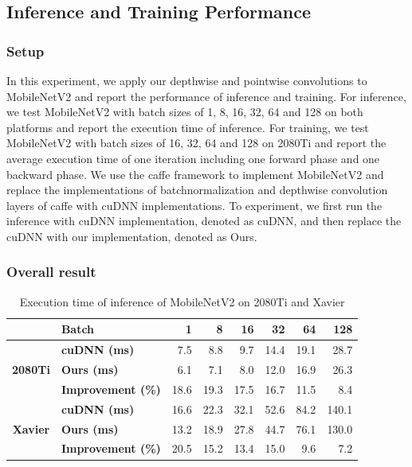\subsection{Inference and Training Performance}
\label{sec:inferexp}
\subsubsection{Setup} 
In this experiment, we apply our depthwise and pointwise convolutions to MobileNetV2 and report the performance of inference and training. 
For inference, we test MobileNetV2 with batch sizes of 1, 8, 16, 32, 64 and 128 on both platforms and report the execution time of inference. 
For training, we test MobileNetV2 with batch sizes of 16, 32, 64 and 128 on 2080Ti and report the average execution time of one iteration including one forward phase and one backward phase.
We use the caffe framework to implement MobileNetV2 and replace the implementations of batchnormalization and depthwise convolution layers of caffe with cuDNN implementations. 
To experiment, we first run the inference with cuDNN implementation, denoted as cuDNN, and then replace the cuDNN with our implementation, denoted as Ours.

\subsubsection{Overall result}
\begin{table}[]
\setlength{\tabcolsep}{4.6pt}
    \caption{Execution time of inference of MobileNetV2 on 2080Ti and Xavier}
    \label{tab:infertime}
    \centering
    \begin{threeparttable}
    \begin{tabular}{c|l|rrrrrr}
    \toprule
    &\textbf{Batch} & 1 & 8 & 16& 32 &64 & 128\\
    \midrule
    \multirow{3}{*}{\textbf{2080Ti}}&\textbf{cuDNN (ms)} & 7.5  & 8.8 & 9.7 & 14.4 & 19.1 &28.7 \\
    &\textbf{Ours (ms)} &6.1   &7.1    & 8.0  &12.0 &16.9 &26.3\\
    &\textbf{Improvement (\%)} &18.6   &19.3    &17.5  & 16.7 &11.5 &8.4 \\
    \hline
    \multirow{3}{*}{\textbf{Xavier}}&\textbf{cuDNN (ms)} & 16.6&22.3&32.1&52.6&84.2&140.1  \\
    &\textbf{Ours (ms)} &13.2&18.9&27.8&44.7&76.1&130.0 \\
    &\textbf{Improvement (\%)} & 20.5&15.2&13.4&15.0&9.6&7.2 \\
    \bottomrule
    \end{tabular}
    \footnotesize
    \end{threeparttable}
    \vspace{-5mm}
\end{table}

